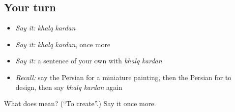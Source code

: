 \subsection*{Your turn}
\begin{itemize}
\raggedright
  \item \emph{Say it:} \emph{khalq kardan}
  \item \emph{Say it:} \emph{khalq kardan}, once more
  \item \emph{Say it:} a sentence of your own with \emph{khalq kardan}
  \item \emph{Recall:} say the Persian for a miniature painting, then the Persian for to design, then say \emph{khalq kardan} again
\end{itemize}

\begin{tcolorbox}[breakable,colback=teal!4,colframe=teal!35!black,title={Before you move on}]
What does   mean? (\textquotedblleft{}To create\textquotedblright{}.) Say it once more.
\end{tcolorbox}
